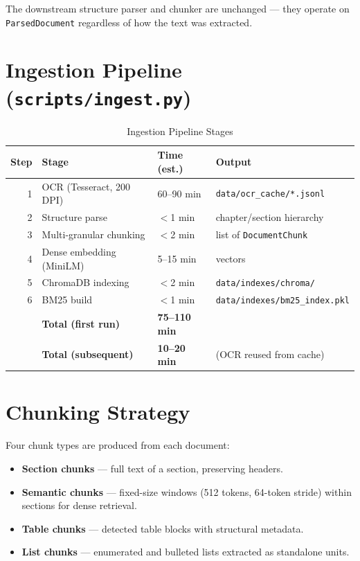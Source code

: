 \documentclass[12pt,a4paper]{report}
\begin{document}
The downstream structure parser and chunker are unchanged --- they operate on \texttt{ParsedDocument} regardless of how the text was extracted.

\section{Ingestion Pipeline (\texttt{scripts/ingest.py})}

\begin{table}[H]
\centering
\caption{Ingestion Pipeline Stages}
\begin{tabular}{@{}rlll@{}}
\toprule
\textbf{Step} & \textbf{Stage} & \textbf{Time (est.)} & \textbf{Output} \\
\midrule
1 & OCR (Tesseract, 200 DPI) & 60--90 min & \texttt{data/ocr\_cache/*.jsonl} \\
2 & Structure parse & $<$1 min & chapter/section hierarchy \\
3 & Multi-granular chunking & $<$2 min & list of \texttt{DocumentChunk} \\
4 & Dense embedding (MiniLM) & 5--15 min & vectors \\
5 & ChromaDB indexing & $<$2 min & \texttt{data/indexes/chroma/} \\
6 & BM25 build & $<$1 min & \texttt{data/indexes/bm25\_index.pkl} \\
\midrule
  & \textbf{Total (first run)} & \textbf{75--110 min} & \\
  & \textbf{Total (subsequent)} & \textbf{10--20 min} & (OCR reused from cache) \\
\bottomrule
\end{tabular}
\end{table}

\section{Chunking Strategy}

Four chunk types are produced from each document:

\begin{itemize}
  \item \textbf{Section chunks} --- full text of a section, preserving headers.
  \item \textbf{Semantic chunks} --- fixed-size windows (512 tokens, 64-token stride) within sections for dense retrieval.
  \item \textbf{Table chunks} --- detected table blocks with structural metadata.
  \item \textbf{List chunks} --- enumerated and bulleted lists extracted as standalone units.
\end{itemize}
\end{document}

